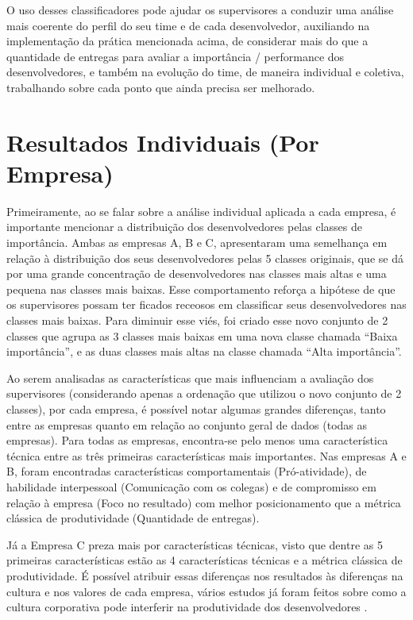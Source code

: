 O uso desses classificadores pode ajudar os supervisores a conduzir uma análise mais coerente do perfil do seu time e de cada desenvolvedor, auxiliando na implementação da prática mencionada acima, de considerar mais do que a quantidade de entregas para avaliar a importância / performance dos desenvolvedores, e também na evolução do time, de maneira individual e coletiva, trabalhando sobre cada ponto que ainda precisa ser melhorado.

\section{Resultados Individuais (Por Empresa)}


Primeiramente, ao se falar sobre a análise individual aplicada a cada empresa, é importante mencionar a distribuição dos desenvolvedores pelas classes de importância. Ambas as empresas A, B e C, apresentaram uma semelhança em relação à distribuição dos seus desenvolvedores pelas 5 classes originais, que se dá por uma grande concentração de desenvolvedores nas classes mais altas e uma pequena nas classes mais baixas. Esse comportamento reforça a hipótese de que os supervisores possam ter ficados receosos em classificar seus desenvolvedores nas classes mais baixas. Para diminuir esse viés, foi criado esse novo conjunto de 2 classes que agrupa as 3 classes mais baixas em uma nova classe chamada ``Baixa importância'', e as duas classes mais altas na classe chamada ``Alta importância''.


Ao serem analisadas as características que mais influenciam a avaliação dos supervisores (considerando apenas a ordenação que utilizou o novo conjunto de 2 classes), por cada empresa, é possível notar algumas grandes diferenças, tanto entre as empresas quanto em relação ao conjunto geral de dados (todas as empresas). Para todas as empresas, encontra-se pelo menos uma característica técnica entre as três primeiras características mais importantes. Nas empresas A e B, foram encontradas características comportamentais (Pró-atividade), de habilidade interpessoal (Comunicação com os colegas) e de compromisso em relação à empresa (Foco no resultado) com melhor posicionamento que a métrica clássica de produtividade (Quantidade de entregas).

Já a Empresa C preza mais por características técnicas, visto que dentre as 5 primeiras características estão as 4 características técnicas e a métrica clássica de produtividade. É possível atribuir essas diferenças nos resultados às diferenças na cultura e nos valores de cada empresa, vários estudos já foram feitos sobre como a cultura corporativa pode interferir na produtividade dos desenvolvedores \cite{Edmans2011,Jones2000,Scudder1991,AgrellA.andGustafson1994,Guzzo1988,McLean1996,Turcotte2004}.

